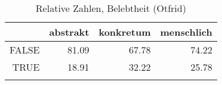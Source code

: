 \begin{table}[ht]
\centering
\begin{tabular}{rrrr}
  \lsptoprule
 & abstrakt & konkretum & menschlich \\ 
  \midrule
FALSE & 81.09 & 67.78 & 74.22 \\ 
  TRUE & 18.91 & 32.22 & 25.78 \\ 
   \lspbottomrule
\end{tabular}
\caption{Relative Zahlen, Belebtheit  (Otfrid)} 
\end{table}
